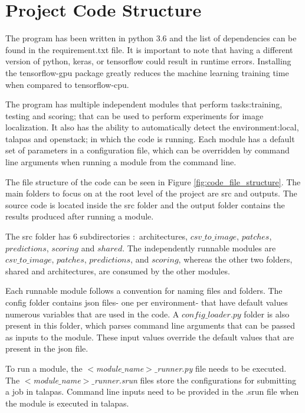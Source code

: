 \section{Project Code Structure}

The program has been written in python 3.6 and the list of dependencies can be found in the requirement.txt file. It is important 
to note that having a different version of python, keras, or tensorflow could result in runtime errors. Installing the tensorflow-gpu 
package greatly reduces the machine learning training time when compared to tensorflow-cpu.

The program has multiple independent modules that perform tasks:training, testing and scoring; that can be used to perform experiments 
for image localization. It also has the ability to automatically detect the environment:local, talapas and openstack; in which the code
 is running. Each module has a default set of parameters in a configuration file, which can be overridden by command line arguments 
 when running a module from the command line.

The file structure of the code can be seen in Figure \ref{fig:code_file_structure}. The main folders to focus on at the root level of the project are src and 
outputs. The source code is located inside the src folder and the output folder contains the results produced after running a module.

The src folder has 6 subdirectories $\colon$ architectures, $csv\_to\_image$, $patches$, $predictions$, $scoring$ and $shared$. The 
independently runnable 
modules are $csv\_to\_image$, $patches$, $predictions$, and $scoring$, whereas the other two folders, shared and architectures, are consumed by 
the other modules.

Each runnable module follows a convention for naming files and folders. The config folder contains json files- one per environment- that 
have default values numerous variables that are used in the code. A \emph{$config\_loader.py$} folder is also present in this folder, which parses 
command line arguments that can be passed as inputs to the module. These input values override the default values that are present in 
the json file. 

To run a module, the \emph{$<$module$\_$name$>$$\_$runner.py} file needs to be executed. The \emph{$<$module$\_$name$>$$\_$runner.srun} files store the 
configurations for submitting a job in talapas. Command line inputs need to be provided in the .srun file when the module is executed in talapas. 

